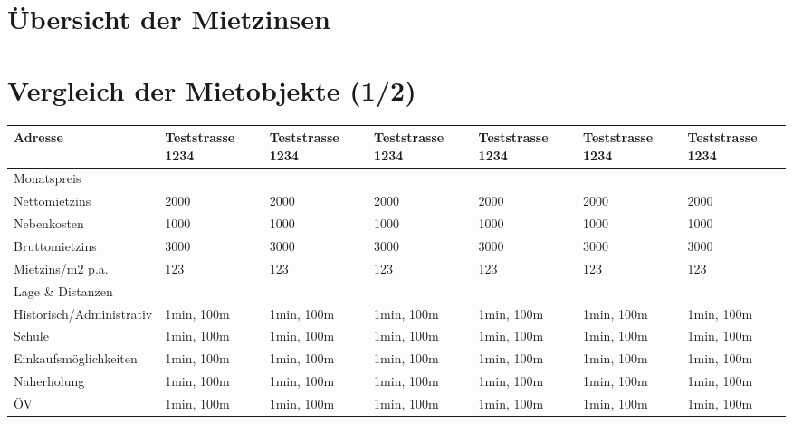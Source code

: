 \documentclass{article}
\begin{document}
	\clearpage
	\section{Übersicht der Mietzinsen}
	
	\clearpage


	\section{Vergleich der Mietobjekte (1/2)}
	\begin{table}[!htbp]
		\begin{flushleft}
			\renewcommand{\arraystretch}{1.1}
			\setlength{\tabcolsep}{10pt}
			\begin{tabular}{ |l|l|l|l|l|l|l| } 
				\hline
				Adresse & \cellcolor{lightgray} Teststrasse 1234 & Teststrasse 1234 & Teststrasse 1234 & Teststrasse 1234 & Teststrasse 1234 & Teststrasse 1234 \\ 
				\hline
				\rowcolor{gray} Monatspreis & & & & & &  \\ 
				\hline
				Nettomietzins & \cellcolor{lightgray} 2000 & 2000 & 2000 & 2000 & 2000 & 2000\\ 
				\hline
				Nebenkosten & \cellcolor{lightgray} 1000 & 1000 & 1000 & 1000 & 1000 & 1000 \\ 
				\hline
				Bruttomietzins & \cellcolor{lightgray} 3000 & 3000 & 3000 & 3000 & 3000 & 3000 \\ 
				\hline
				Mietzins/m2 p.a. & \cellcolor{lightgray} 123 & 123 & 123 & 123 & 123 & 123 \\ 
				\hline
				\rowcolor{gray} Lage \& Distanzen & & & & & &  \\ 
				\hline
				Historisch/Administrativ & \cellcolor{lightgray} 1min, 100m & 1min, 100m & 1min, 100m & 1min, 100m & 1min, 100m & 1min, 100m \\ 
				\hline
				Schule & \cellcolor{lightgray} 1min, 100m & 1min, 100m & 1min, 100m & 1min, 100m & 1min, 100m & 1min, 100m \\ 
				\hline
				Einkaufsmöglichkeiten & \cellcolor{lightgray} 1min, 100m & 1min, 100m & 1min, 100m & 1min, 100m & 1min, 100m & 1min, 100m \\ 
				\hline
				Naherholung & \cellcolor{lightgray} 1min, 100m & 1min, 100m & 1min, 100m & 1min, 100m & 1min, 100m & 1min, 100m \\ 
				\hline
				ÖV & \cellcolor{lightgray} 1min, 100m & 1min, 100m & 1min, 100m & 1min, 100m & 1min, 100m & 1min, 100m \\ 
				\hline

\end{tabular}
\end{flushleft}
\end{table}
\end{document}
